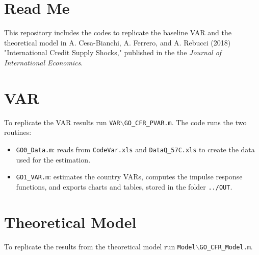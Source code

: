 \documentclass{article}
\begin{document}
\section*{Read Me}

\noindent This repository includes the codes to replicate the baseline VAR and the theoretical model in A. Cesa-Bianchi, A. Ferrero, and A. Rebucci (2018) "International Credit Supply Shocks," published in the the \textit{Journal of International Economics}. 

\section*{VAR}
To replicate the VAR results run \texttt{VAR$\backslash$GO\_CFR\_PVAR.m}. The code runs the two routines:
\begin{itemize}
	\item \texttt{GO0\_Data.m}: reads from \texttt{CodeVar.xls} and \texttt{DataQ\_57C.xls} to create the data used for the estimation. 
	\item \texttt{GO1\_VAR.m}: estimates the country VARs, computes the impulse response functions, and exports charts and tables, stored in the folder \texttt{../OUT}.
\end{itemize}

\section*{Theoretical Model}
To replicate the results from the theoretical model run \texttt{Model$\backslash$GO\_CFR\_Model.m}. 
\end{document}
